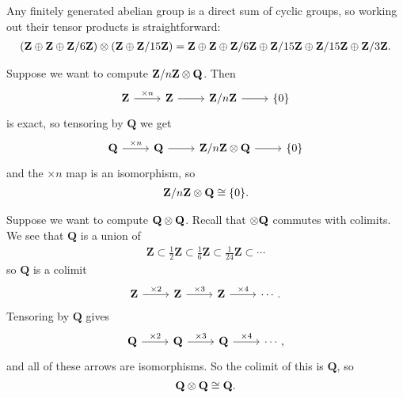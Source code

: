 \documentclass[11pt, oneside,margin=1in]{article}
\begin{document}
Any finitely generated abelian group is a direct sum of cyclic groups, so working out their tensor products is straightforward:
\begin{align*}
	(\mathbf{Z}\oplus \mathbf{Z}\oplus \mathbf Z / 6\mathbf Z) \otimes(\mathbf{Z}\oplus \mathbf Z / 15\mathbf Z) = \mathbf{Z}\oplus \mathbf{Z}\oplus \mathbf Z / 6\mathbf Z\oplus \mathbf Z / 15\mathbf Z\oplus \mathbf Z / 15\mathbf Z\oplus \mathbf Z / 3\mathbf Z.
\end{align*}
\begin{example}\label{}
	Suppose we want to compute $\mathbf Z / n\mathbf Z \otimes \mathbf Q$. Then
	\[
	\begin{tikzcd}
	\Z \arrow[r, "\times n"] & \Z\arrow[r]& \Zmod n\arrow[r] & \{0\}
	\end{tikzcd}
	\]
	is exact, so tensoring by $\mathbf{Q}$ we get
	\[
	\begin{tikzcd}
	\Q \arrow[r, "\times n"] & \mathbf{Q}\arrow[r]& \Zmod n\tensor \mathbf{Q}\arrow[r] & \{0\}
	\end{tikzcd}
	\]
	and the $\times n$ map is an isomorphism, so 
	\begin{align*}
		\mathbf Z / n\mathbf Z \otimes \mathbf Q \cong\{0\}.
	\end{align*}
\end{example}
\begin{example}\label{}
Suppose we want to compute $\mathbf{Q}\otimes \mathbf{Q}$. Recall that $\otimes \mathbf{Q}$ commutes with colimits. We see that $\mathbf{Q}$ is a union of \begin{align*}
	\mathbf{Z}\subset \frac{1}{2}\mathbf{Z}\subset\frac{1}{6}\mathbf{Z} \subset \frac{1}{24}\mathbf{Z} \subset \cdots
\end{align*}
so $\mathbf{Q}$ is a colimit
\[
\begin{tikzcd}
	\mathbf{Z} \arrow[r, "\times 2"] & \mathbf{Z} \arrow[r, "\times 3"] & \mathbf{Z} \arrow[r, "\times 4"] & \cdots.
\end{tikzcd}
\]
Tensoring by $\mathbf{Q}$ gives
\[
\begin{tikzcd}
\mathbf{Q} \arrow[r, "\times 2"] & \mathbf{Q} \arrow[r, "\times 3"] & \mathbf{Q} \arrow[r, "\times 4"] & \cdots,
\end{tikzcd}
\]
and all of these arrows are isomorphisms. So the colimit of this is $\mathbf{Q}$, so
\begin{align*}
	\mathbf{Q}\otimes \mathbf{Q}\cong \mathbf{Q}.
\end{align*}
\end{example}
\end{document}
